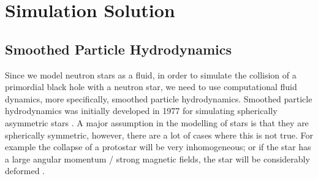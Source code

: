 %
%
% 
%
%
%
%
%

\chapter{Simulation Solution}
\label{chap:sim}

\section{Smoothed Particle Hydrodynamics}

Since we model neutron stars as a fluid, in order to simulate the collision of a primordial black hole with a neutron star, we need to use computational fluid dynamics, more specifically, smoothed particle hydrodynamics. Smoothed particle hydrodynamics was initially developed in 1977 for simulating spherically asymmetric stars \cite{origsph}. A major assumption in the modelling of stars is that they are spherically symmetric, however, there are a lot of cases where this is not true. For example the collapse of a protostar will be very inhomogeneous; or if the star has a large angular momentum / strong magnetic fields, the star will be considerably deformed \cite{origsph}. \\

